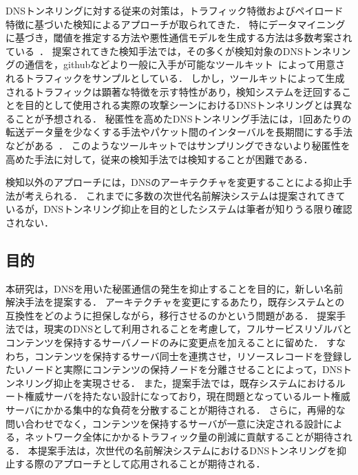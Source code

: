 DNSトンネリングに対する従来の対策は，トラフィック特徴およびペイロード特徴に基づいた検知によるアプローチが取られてきた．
特にデータマイニングに基づき，閾値を推定する方法や悪性通信モデルを生成する方法は多数考案されている~\cite{born, cheng, liu, asaf, steadman, jawad}．
提案されてきた検知手法では，その多くが検知対象のDNSトンネリングの通信を，githubなどより一般に入手が可能なツールキット~\cite{ozymandns, iodine, dnscat2}によって用意されるトラフィックをサンプルとしている．
しかし，ツールキットによって生成されるトラフィックは顕著な特徴を示す特性があり，検知システムを迂回することを目的として使用される実際の攻撃シーンにおけるDNSトンネリングとは異なることが予想される．
秘匿性を高めたDNSトンネリング手法には，1回あたりの転送データ量を少なくする手法やパケット間のインターバルを長期間にする手法などがある~\cite{asaf}．
このようなツールキットではサンプリングできないより秘匿性を高めた手法に対して，従来の検知手法では検知することが困難である．

検知以外のアプローチには，DNSのアーキテクチャを変更することによる抑止手法が考えられる．
これまでに多数の次世代名前解決システムは提案されてきているが，DNSトンネリング抑止を目的としたシステムは筆者が知りうる限り確認されない．


\subsection{目的}
本研究は，DNSを用いた秘匿通信の発生を抑止することを目的に，新しい名前解決手法を提案する．
アーキテクチャを変更にするあたり，既存システムとの互換性をどのように担保しながら，移行させるのかという問題がある．
提案手法では，現実のDNSとして利用されることを考慮して，フルサービスリゾルバとコンテンツを保持するサーバノードのみに変更点を加えることに留めた．
すなわち，コンテンツを保持するサーバ同士を連携させ，リソースレコードを登録したいノードと実際にコンテンツの保持ノードを分離させることによって，DNSトンネリング抑止を実現させる．
また，提案手法では，既存システムにおけるルート権威サーバを持たない設計になっており，現在問題となっているルート権威サーバにかかる集中的な負荷を分散することが期待される．
さらに，再帰的な問い合わせでなく，コンテンツを保持するサーバが一意に決定される設計による，ネットワーク全体にかかるトラフィック量の削減に貢献することが期待される．
本提案手法は，次世代の名前解決システムにおけるDNSトンネリングを抑止する際のアプローチとして応用されることが期待される．




